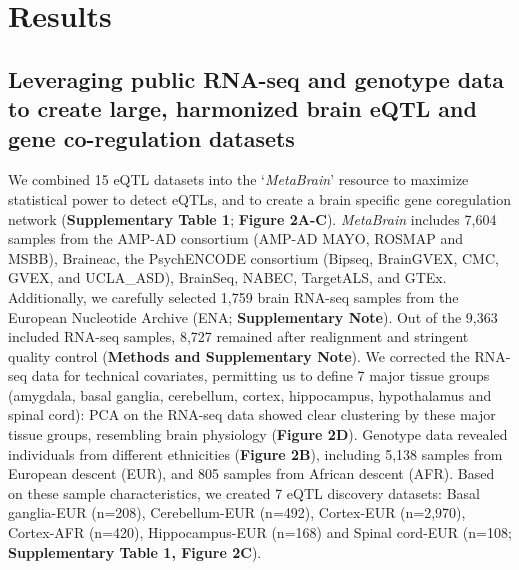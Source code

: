 \section{Results}
\subsection{Leveraging public RNA-seq and genotype data to create large, harmonized brain eQTL and gene co-regulation datasets}
We combined 15 eQTL datasets into the ‘\emph{MetaBrain}’ resource to maximize statistical power to detect eQTLs, and to create a brain specific gene coregulation network (\textbf{Supplementary Table 1}; \textbf{Figure 2A-C}). \emph{MetaBrain} includes 7,604 samples from the AMP-AD consortium\cite{hodesAcceleratingMedicinesPartnership2016} (AMP-AD MAYO\cite{hodesAcceleratingMedicinesPartnership2016}, ROSMAP\cite{hodesAcceleratingMedicinesPartnership2016} and MSBB\cite{hodesAcceleratingMedicinesPartnership2016}), Braineac\cite{ramasamyGeneticVariabilityRegulation2014}, the PsychENCODE consortium\cite{consortium*RevealingBrainMolecular2018} (Bipseq\cite{wangComprehensiveFunctionalGenomic2018}, BrainGVEX\cite{wangComprehensiveFunctionalGenomic2018}, CMC\cite{fromerGeneExpressionElucidates2016}, GVEX, and UCLA\_ASD\cite{wangComprehensiveFunctionalGenomic2018}), BrainSeq\cite{brainseq2015}, NABEC\cite{gibbsAbundantQuantitativeTrait2010}, TargetALS\cite{prudencioDistinctBrainTranscriptome2015}, and GTEx\cite{donovanCellularDeconvolutionGTEx2020}. Additionally, we carefully selected 1,759 brain RNA-seq samples from the European Nucleotide Archive (ENA; \textbf{Supplementary Note})\cite{leinonenEuropeanNucleotideArchive2011}. Out of the 9,363 included RNA-seq samples, 8,727 remained after realignment and stringent quality control (\textbf{Methods and Supplementary Note}). We corrected the RNA-seq data for technical covariates, permitting us to define 7 major tissue groups (amygdala, basal ganglia, cerebellum, cortex, hippocampus, hypothalamus and spinal cord): PCA on the RNA-seq data showed clear clustering by these major tissue groups, resembling brain physiology (\textbf{Figure 2D}). Genotype data revealed individuals from different ethnicities (\textbf{Figure 2B}), including 5,138 samples from European descent (EUR), and 805 samples from African descent (AFR). Based on these sample characteristics, we created 7 eQTL discovery datasets: Basal ganglia-EUR (n=208), Cerebellum-EUR (n=492), Cortex-EUR (n=2,970), Cortex-AFR (n=420), Hippocampus-EUR (n=168) and Spinal cord-EUR (n=108; \textbf{Supplementary Table 1, Figure 2C}).

